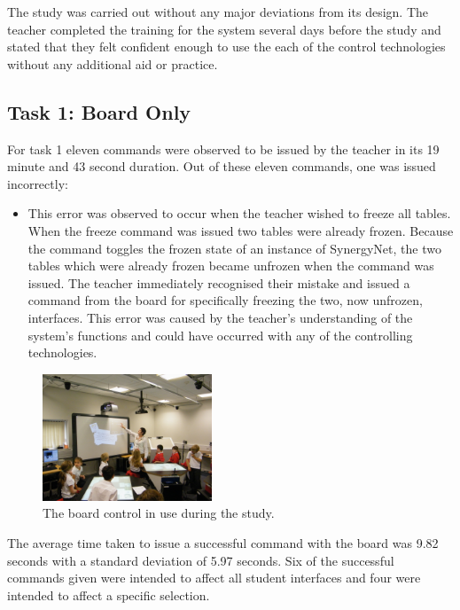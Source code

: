 \documentclass[link]{IWCOMP}
\begin{document}
The study was carried out without any major deviations from its design.
The teacher completed the training for the system several days before the study and stated that they felt confident enough to use the each of the control technologies without any additional aid or practice.

\subsection{Task 1: Board Only}
\label{subsec:resultsTask1}

For task 1 eleven commands were observed to be issued by the teacher in its 19 minute and 43 second duration.
Out of these eleven commands, one was issued incorrectly:

\begin{itemize}
\item This error was observed to occur when the teacher wished to freeze all tables.
When the freeze command was issued two tables were already frozen.
Because the command toggles the frozen state of an instance of SynergyNet, the two tables which were already frozen became unfrozen when the command was issued.
The teacher immediately recognised their mistake and issued a command from the board for specifically freezing the two, now unfrozen, interfaces.
This error was caused by the teacher's understanding of the system's functions and could have occurred with any of the controlling technologies.
\end{itemize}

\begin{figure}[h]
   \centering
   \includegraphics[width=0.45\textwidth]{figures/study_board.png}
   \caption{The board control in use during the study.}
   \label{fig:studyBoard}
\end{figure}

The average time taken to issue a successful command with the board was 9.82 seconds with a standard deviation of 5.97 seconds.
Six of the successful commands given were intended to affect all student interfaces and four were intended to affect a specific selection.
\end{document}
